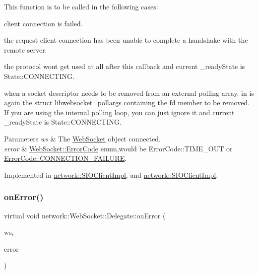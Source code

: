 This function is to be called in the following cases\+:
\begin{DoxyEnumerate}
\item client connection is failed.
\item the request client connection has been unable to complete a handshake with the remote server.
\item the protocol won\textquotesingle{}t get used at all after this callback and current \+\_\+ready\+State is State\+::\+C\+O\+N\+N\+E\+C\+T\+I\+NG.
\item when a socket descriptor needs to be removed from an external polling array. in is again the struct libwebsocket\+\_\+pollargs containing the fd member to be removed. If you are using the internal polling loop, you can just ignore it and current \+\_\+ready\+State is State\+::\+C\+O\+N\+N\+E\+C\+T\+I\+NG.
\end{DoxyEnumerate}


\begin{DoxyParams}{Parameters}
{\em ws} & The \hyperlink{classnetwork_1_1WebSocket}{Web\+Socket} object connected. \\
\hline
{\em error} & \hyperlink{classnetwork_1_1WebSocket_a33c111a23355ac485e3a56c9d0ab9a59}{Web\+Socket\+::\+Error\+Code} enum,would be Error\+Code\+::\+T\+I\+M\+E\+\_\+\+O\+UT or \hyperlink{classnetwork_1_1WebSocket_a33c111a23355ac485e3a56c9d0ab9a59a9ce818a4b52e8a8c6539fe6391392369}{Error\+Code\+::\+C\+O\+N\+N\+E\+C\+T\+I\+O\+N\+\_\+\+F\+A\+I\+L\+U\+RE}. \\
\hline
\end{DoxyParams}


Implemented in \hyperlink{classnetwork_1_1SIOClientImpl_a850038d23057d9882f5d689bc7051008}{network\+::\+S\+I\+O\+Client\+Impl}, and \hyperlink{classnetwork_1_1SIOClientImpl_a903007575dfa680fc980fe11ac88b61e}{network\+::\+S\+I\+O\+Client\+Impl}.

\mbox{\label{classnetwork_1_1WebSocket_1_1Delegate_a0ed2d5dde9abc2901f387b7274221dc4}} 
\subsubsection{\texorpdfstring{on\+Error()}{onError()}\hspace{0.1cm}{\footnotesize\ttfamily [2/2]}}
{\footnotesize\ttfamily virtual void network\+::\+Web\+Socket\+::\+Delegate\+::on\+Error (\begin{DoxyParamCaption}\item[{\hyperlink{classnetwork_1_1WebSocket}{Web\+Socket} $\ast$}]{ws,  }\item[{const \hyperlink{classnetwork_1_1WebSocket_a33c111a23355ac485e3a56c9d0ab9a59}{Error\+Code} \&}]{error }\end{DoxyParamCaption})\hspace{0.3cm}{\ttfamily [pure virtual]}}

